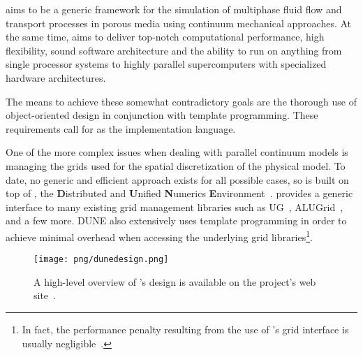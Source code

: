 
\Dumux aims to be a generic framework for the simulation of multiphase
fluid flow and transport processes in porous media using continuum
mechanical approaches.  At the same time, \Dumux aims to deliver
top-notch computational performance, high flexibility, sound
software architecture and the ability to run on anything from single
processor systems to highly parallel supercomputers with specialized
hardware architectures.

The means to achieve these somewhat contradictory goals are the
thorough use of object-oriented design in conjunction with template
programming. These requirements call for \Cplusplus as the implementation
language.

One of the more complex issues when dealing with parallel continuum
models is managing the grids used for the spatial discretization of
the physical model. To date, no generic and efficient approach exists
for all possible cases, so \Dumux is built on top of \Dune, the
\textbf{D}istributed and \textbf{U}nified \textbf{N}umerics
\textbf{E}nvironment~\cite{DUNE-HP}. \Dune provides a generic interface
to many existing grid management libraries such as UG~\cite{UG-HP},
ALUGrid~\cite{ALUGRID-HP,alugrid2016}, and a few more.
DUNE also extensively uses template programming in order to
achieve minimal overhead when accessing the underlying grid
libraries\footnote{In fact, the performance penalty resulting from the
use of \Dune's grid interface is usually negligible~\cite{BURRI2006}.}.
\begin{figure}[hbt]
  \centering
  \texttt{[image: png/dunedesign.png]}
  \caption{
    \label{fig:dune-design}
    A high-level overview of \Dune's design is available on the project's
    web site~\cite{DUNE-HP}.
  }
\end{figure}

